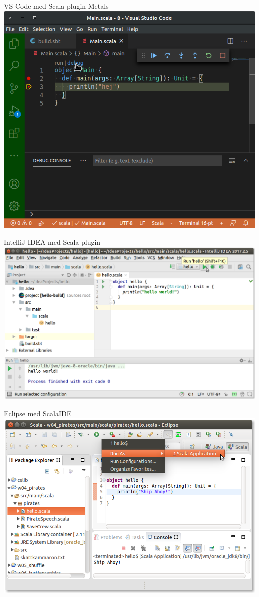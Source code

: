 \begin{Slide}{VS Code med Scala-plugin Metals}
\includegraphics[width=\textwidth]{../img/vscode-debug.png}
\end{Slide}
  

\begin{Slide}{IntelliJ IDEA med Scala-plugin}
\includegraphics[width=\textwidth]{../img/intellij/idea-hello.png}
\end{Slide}

\begin{Slide}{Eclipse med ScalaIDE}
\includegraphics[width=\textwidth]{../img/eclipse/eclipse-pirates-hello.png}
\end{Slide}

